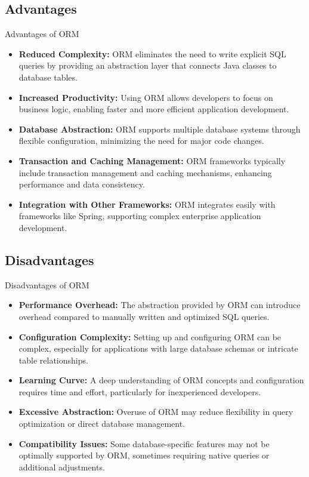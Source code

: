 \documentclass[aspectratio=169, table]{beamer}
\begin{document}
\subsection{Advantages}
\begin{frame}{Advantages of ORM}
	\vspace{20pt}
	\begin{itemize}
		\item \textbf{Reduced Complexity:} ORM eliminates the need to write explicit SQL queries by providing an abstraction layer that connects Java classes to database tables.
		\item \textbf{Increased Productivity:} Using ORM allows developers to focus on business logic, enabling faster and more efficient application development.
		\item \textbf{Database Abstraction:} ORM supports multiple database systems through flexible configuration, minimizing the need for major code changes.
		\item \textbf{Transaction and Caching Management:} ORM frameworks typically include transaction management and caching mechanisms, enhancing performance and data consistency.
		\item \textbf{Integration with Other Frameworks:} ORM integrates easily with frameworks like Spring, supporting complex enterprise application development.
	\end{itemize}
\end{frame}

\subsection{Disadvantages}
\begin{frame}{Disadvantages of ORM}
	\vspace{20pt}
	\begin{itemize}
		\item \textbf{Performance Overhead:} The abstraction provided by ORM can introduce overhead compared to manually written and optimized SQL queries.
		\item \textbf{Configuration Complexity:} Setting up and configuring ORM can be complex, especially for applications with large database schemas or intricate table relationships.
		\item \textbf{Learning Curve:} A deep understanding of ORM concepts and configuration requires time and effort, particularly for inexperienced developers.
		\item \textbf{Excessive Abstraction:} Overuse of ORM may reduce flexibility in query optimization or direct database management.
		\item \textbf{Compatibility Issues:} Some database-specific features may not be optimally supported by ORM, sometimes requiring native queries or additional adjustments.
	\end{itemize}
\end{frame}
\end{document}
